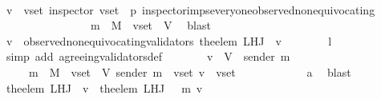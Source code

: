 \begin{isabellebody}
\ \ \ \ \ \ \isamarkupfalse%
\ {\isacartoucheopen}v\ {\isasymin}\ v{\isacharunderscore}set{\isacartoucheclose}\ {\isacartoucheopen}inspector\ {\isacharparenleft}v{\isacharunderscore}set{\isacharcomma}\ {\isasymsigma}{\isacharcomma}\ p{\isacharparenright}{\isacartoucheclose}\ inspector{\isacharunderscore}imps{\isacharunderscore}everyone{\isacharunderscore}observed{\isacharunderscore}non{\isacharunderscore}equivocating\isanewline
\ \ \ \ \ \ \ \ \ \ \ \ {\isacartoucheopen}{\isasymsigma}\ {\isasymin}\ {\isasymSigma}\ {\isasymand}\ m\ {\isasymin}\ M\ {\isasymand}\ v{\isacharunderscore}set\ {\isasymsubseteq}\ V{\isacartoucheclose}\ \isamarkupfalse%
\ blast\ \isanewline
\ \ \ \ \isamarkupfalse%
\ {\isachardoublequoteopen}v{\isacharprime}\ {\isasymin}\ observed{\isacharunderscore}non{\isacharunderscore}equivocating{\isacharunderscore}validators\ {\isacharparenleft}the{\isacharunderscore}elem\ {\isacharparenleft}L{\isacharunderscore}H{\isacharunderscore}J\ {\isasymsigma}\ v{\isacharparenright}{\isacharparenright}{\isachardoublequoteclose}\isanewline
\ \ \ \ \ \ \isamarkupfalse%
\ l{}\ \isamarkupfalse%
\ {\isacharparenleft}simp\ add{\isacharcolon}\ agreeing{\isacharunderscore}validators{\isacharunderscore}def{\isacharparenright}\isanewline
\ \ \ \ \isamarkupfalse%
\ \isamarkupfalse%
\ {\isachardoublequoteopen}v{\isacharprime}\ {\isasymin}\ V\ {\isacharminus}\ {\isacharbraceleft}sender\ m{\isacharbraceright}{\isachardoublequoteclose}\isanewline
\ \ \ \ \ \ \isamarkupfalse%
\ {\isacartoucheopen}{\isasymsigma}\ {\isasymin}\ {\isasymSigma}\ {\isasymand}\ m\ {\isasymin}\ M\ {\isasymand}\ v{\isacharunderscore}set\ {\isasymsubseteq}\ V{\isacartoucheclose}\ {\isacartoucheopen}sender\ m\ {\isasymnotin}\ v{\isacharunderscore}set{\isacartoucheclose}\ {\isacartoucheopen}v{\isacharprime}\ {\isasymin}\ v{\isacharunderscore}set{\isacharprime}{\isacartoucheclose}\isanewline
\ \ \ \ \ \ \ \ \ \ \ \ a{}\ \isamarkupfalse%
\ blast\ \isanewline
\ \ \ \ \isamarkupfalse%
\ \isamarkupfalse%
\ \isamarkupfalse%
\ {\isachardoublequoteopen}the{\isacharunderscore}elem\ {\isacharparenleft}L{\isacharunderscore}H{\isacharunderscore}J\ {\isasymsigma}\ v{\isacharparenright}\ {\isacharequal}\ the{\isacharunderscore}elem\ {\isacharparenleft}L{\isacharunderscore}H{\isacharunderscore}J\ {\isacharparenleft}{\isasymsigma}\ {\isasymunion}\ {\isacharbraceleft}m{\isacharbraceright}{\isacharparenright}\ v{\isacharparenright}{\isachardoublequoteclose}\isanewline

\end{isabellebody}

